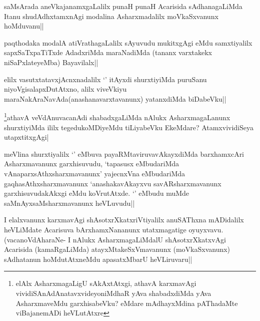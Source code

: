 \begin{artha}
saMsArada aneVkajanamxgaLalilx punaH punaH Acarisida sAdhanagaLiMda Itanu shudAdhxtamxnAgi modalina Asharxmadalilx moVkaSxvanunx hoMduvanu||
\end{artha}


\begin{artha}
paqthodaka modalA atiVrathagaLalilx sAyuvudu mukitxgAgi eMdu samxtiyalilx sapxSaTxpaTiTxde AdadxriMda maraNadiMda (tananx varxtakekx niSaPxlateyeMba) Bayavilalx||
\end{artha}

\begin{artha}
elilx vasutxtatavxjAcnxnadalilx `\stext' itAyxdi shurxtiyiMda puruSanu niyoVgisalapxDutAtxno, alilx viveVkiyu maraNakAraNavAda(anashanavarxtavanunx) yatanxdiMda biDabeVku||
\end{artha}

\begin{artha}
\footnote{elAlx AsharxmagaLigU sAkAxtAtxgi, athavA karxmavAgi vividiSAnAdAnatavxvideyoniMdhaR yAva shabadxdiMda yAva AsharxmaveMdu garxhisabeVku? eMdare mAdhayxMdina pAThadaMte viBajanemADi heVLutAtxre}athavA veVdAnuvacanAdi shabadxgaLiMda nAlukx AsharxmagaLanunx shurxtiyiMda ililx tegedukoMDiyeMdu tiLiyabeVku EkeMdare? AtamxvividiSeya utapxtitxgAgi|
\end{artha}


\begin{artha}
meVlina shurxtiyalilx `\stext' eMbuva payaRMtaviruvavAkayxdiMda barxhamxcAri Asharxmavanunx garxhisuvudu, `tapasusx eMbudariMda vAnaparxsAthxsharxmavanunx' yajecnxVna eMbudariMda gaqhasAthxsharxmavanunx `anashakavAkayxvu savARsharxmavanunx garxhisuvudakAkxgi eMdu koVrutAtxde. `\stext' eMbudu muMde saMnAyxsaMsharxmavanunx heVLuvudu||
\end{artha}


\begin{artha}
I elalxvanunx karxmavAgi shAsotxrXkatxriVtiyalilx anuSAThxna mADidalilx heVLiMdate Acarisuva bArxhamxNananunx utatxmagatige oyuyxvavu. (vacanoVdAharaNe- I nAlukx AsharxmagaLiMdalU shAsotxrXkatxvAgi Acarisida (kamaRgaLiMda) atayxMtakeSxVmavanunx (moVkaSxvanunx) sAdhatanun hoMdutAtxneMdu apasatxMbarU heVLiruvaru||
\end{artha}

